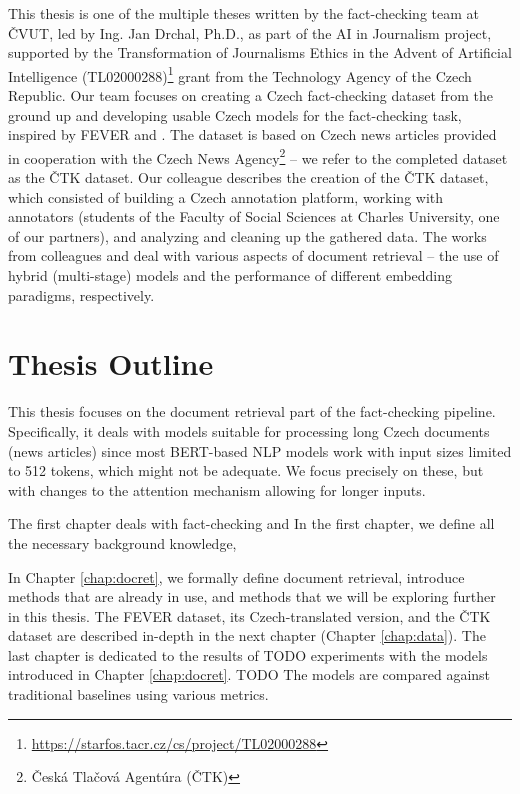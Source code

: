 This thesis is one of the multiple theses written by the fact-checking team at ČVUT, led by Ing. Jan Drchal, Ph.D., as part of the AI in Journalism project, supported by the Transformation of Journalisms Ethics in the Advent of Artificial Intelligence (TL02000288)\footnote{\url{https://starfos.tacr.cz/cs/project/TL02000288}} grant from the Technology Agency of the Czech Republic.
Our team focuses on creating a Czech fact-checking dataset from the ground up and developing usable Czech models for the fact-checking task, inspired by FEVER \citep{fever} and \citet{danish_fever}.
The dataset is based on Czech news articles provided in cooperation with the Czech News Agency\footnote{Česká Tlačová Agentúra (ČTK)} -- we refer to the completed dataset as the ČTK dataset. 
Our colleague \citet{ullrich} describes the creation of the ČTK dataset, which consisted of building a Czech annotation platform, working with annotators (students of the Faculty of Social Sciences at Charles University, one of our partners), and analyzing and cleaning up the gathered data.
The works from colleagues \citet{dedkova} and \citet{rypar} deal with various aspects of document retrieval -- the use of hybrid (multi-stage) models and the performance of different embedding paradigms, respectively.

\section*{Thesis Outline}

This thesis focuses on the document retrieval part of the fact-checking pipeline.
Specifically, it deals with models suitable for processing long Czech documents (news articles) since most BERT-based NLP models work with input sizes limited to 512 tokens, which might not be adequate.
We focus precisely on these, but with changes to the attention mechanism allowing for longer inputs.

The first chapter deals with fact-checking and 
In the first chapter, we define all the necessary background knowledge, 

In Chapter \ref{chap:docret}, we formally define document retrieval, introduce methods that are already in use, and methods that we will be exploring further in this thesis. 
The FEVER dataset, its Czech-translated version, and the ČTK dataset are described in-depth in the next chapter (Chapter \ref{chap:data}).
The last chapter is dedicated to the results of TODO experiments with the models introduced in Chapter \ref{chap:docret}.
TODO The models are compared against traditional baselines using various metrics.